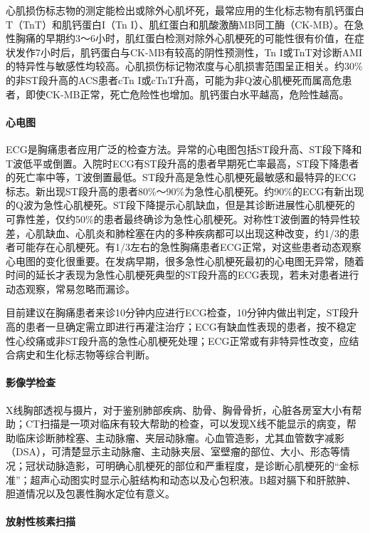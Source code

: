 心肌损伤标志物的测定能检出或除外心肌坏死，最常应用的生化标志物有肌钙蛋白T（TnT）和肌钙蛋白I（Tn
I）、肌红蛋白和肌酸激酶MB同工酶（CK-MB）。在急性胸痛的早期约3～6小时，肌红蛋白检测对除外心肌梗死的可能性很有价值，在症状发作7小时后，肌钙蛋白与CK-MB有较高的阴性预测性，Tn
I或TnT对诊断AMI的特异性与敏感性均较高。心肌损伤标记物浓度与心肌损害范围呈正相关。约30\%的非ST段升高的ACS患者cTn
I或cTnT升高，可能为非Q波心肌梗死而属高危患者，即使CK-MB正常，死亡危险性也增加。肌钙蛋白水平越高，危险性越高。

\paragraph{心电图}

ECG是胸痛患者应用广泛的检查方法。异常的心电图包括ST段升高、ST段下降和T波低平或倒置。入院时ECG有ST段升高的患者早期死亡率最高，ST段下降患者的死亡率中等，T波倒置最低。ST段升高是急性心肌梗死最敏感和最特异的ECG标志。新出现ST段升高的患者80\%～90\%为急性心肌梗死。约90\%的ECG有新出现的Q波为急性心肌梗死。ST段下降提示心肌缺血，但是其诊断进展性心肌梗死的可靠性差，仅约50\%的患者最终确诊为急性心肌梗死。对称性T波倒置的特异性较差，心肌缺血、心肌炎和肺栓塞在内的多种疾病都可以出现这种改变，约1/3的患者可能存在心肌梗死。有1/3左右的急性胸痛患者ECG正常，对这些患者动态观察心电图的变化很重要。在发病早期，很多急性心肌梗死最初的心电图无异常，随着时间的延长才表现为急性心肌梗死典型的ST段升高的ECG表现，若未对患者进行动态观察，常易忽略而漏诊。

目前建议在胸痛患者来诊10分钟内应进行ECG检查，10分钟内做出判定，ST段升高的患者一旦确定需立即进行再灌注治疗；ECG有缺血性表现的患者，按不稳定性心绞痛或非ST段升高的急性心肌梗死处理；ECG正常或有非特异性改变，应结合病史和生化标志物等综合判断。

\paragraph{影像学检查}

X线胸部透视与摄片，对于鉴别肺部疾病、肋骨、胸骨骨折，心脏各房室大小有帮助；CT扫描是一项对临床有较大帮助的检查，可以发现X线不能显示的病变，帮助临床诊断肺栓塞、主动脉瘤、夹层动脉瘤。心血管造影，尤其血管数字减影（DSA），可清楚显示主动脉瘤、主动脉夹层、室壁瘤的部位、大小、形态等情况；冠状动脉造影，可明确心肌梗死的部位和严重程度，是诊断心肌梗死的“金标准”；超声心动图实时显示心脏结构和动态以及心包积液。B超对膈下和肝脓肿、胆道情况以及包裹性胸水定位有意义。

\paragraph{放射性核素扫描}

